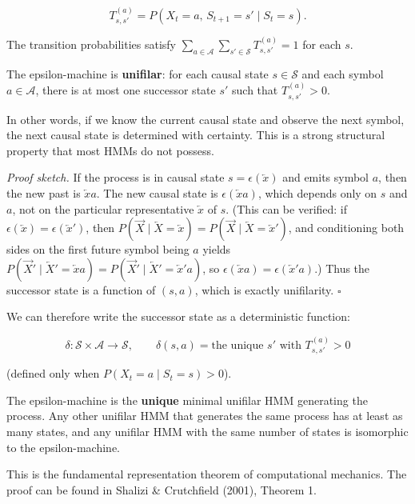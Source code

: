 \[
T^{(a)}_{s,s'} = P(X_t = a, \, S_{t+1} = s' \mid S_t = s).
\]

The transition probabilities satisfy $\sum_{a \in \mathcal{A}} \sum_{s' \in \mathcal{S}} T^{(a)}_{s,s'} = 1$ for each $s$.

\begin{theorem}[Unifilarity]
The epsilon-machine is \textbf{unifilar}: for each causal state $s \in \mathcal{S}$ and each symbol $a \in \mathcal{A}$, there is at most one successor state $s'$ such that $T^{(a)}_{s,s'} > 0$.

In other words, if we know the current causal state and observe the next symbol, the next causal state is determined with certainty. This is a strong structural property that most HMMs do not possess.

\textit{Proof sketch.} If the process is in causal state $s = \epsilon(\overleftarrow{x})$ and emits symbol $a$, then the new past is $\overleftarrow{x}a$. The new causal state is $\epsilon(\overleftarrow{x}a)$, which depends only on $s$ and $a$, not on the particular representative $\overleftarrow{x}$ of $s$. (This can be verified: if $\epsilon(\overleftarrow{x}) = \epsilon(\overleftarrow{x}')$, then $P(\overrightarrow{X} \mid \overleftarrow{X} = \overleftarrow{x}) = P(\overrightarrow{X} \mid \overleftarrow{X} = \overleftarrow{x}')$, and conditioning both sides on the first future symbol being $a$ yields $P(\overrightarrow{X}' \mid \overleftarrow{X}' = \overleftarrow{x}a) = P(\overrightarrow{X}' \mid \overleftarrow{X}' = \overleftarrow{x}'a)$, so $\epsilon(\overleftarrow{x}a) = \epsilon(\overleftarrow{x}'a)$.) Thus the successor state is a function of $(s, a)$, which is exactly unifilarity. $\square$

We can therefore write the successor state as a deterministic function:

\[
\delta: \mathcal{S} \times \mathcal{A} \to \mathcal{S}, \qquad \delta(s, a) = \text{the unique } s' \text{ with } T^{(a)}_{s,s'} > 0
\]

(defined only when $P(X_t = a \mid S_t = s) > 0$).
\end{theorem}

\begin{theorem}
The epsilon-machine is the \textbf{unique} minimal unifilar HMM generating the process. Any other unifilar HMM that generates the same process has at least as many states, and any unifilar HMM with the same number of states is isomorphic to the epsilon-machine.

This is the fundamental representation theorem of computational mechanics. The proof can be found in Shalizi & Crutchfield (2001), Theorem 1.
\end{theorem}

